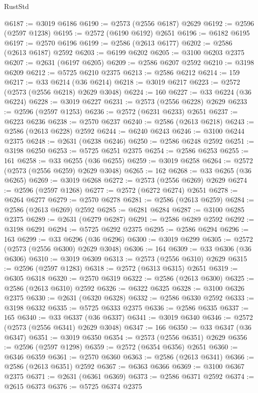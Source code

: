 \begin{lexlean}{RustStd}
\begin{coremodule}
@6187 := @3019 @6186
@6190 := @2573 (@2556 @6187) @2629
@6192 := @2596 (@2597 @1238)
@6195 := @2572 (@6190 @6192) @2651
@6196 := @6182 @6195
@6197 := @2570 @6196
@6199 := @2586 (@2613 @6177)
@6202 := @2586 (@2613 @6187) @2592
@6203 := @6199 @6202
@6205 := @3100 @6203 @2375
@6207 := @2631 (@6197 @6205)
@6209 := @2586 @6207 @2592
@6210 := @3198 @6209
@6212 := @5725 @6210 @2375
@6213 := @2586 @6212
@6214 := 159
@6217 := @33 @6214 (@36 @6214)
@6218 := @3019 @6217
@6223 := @2572 (@2573 (@2556 @6218) @2629 @3048)
@6224 := 160
@6227 := @33 @6224 (@36 @6224)
@6228 := @3019 @6227
@6231 := @2573 (@2556 @6228) @2629
@6233 := @2596 (@2597 @1253)
@6236 := @2572 (@6231 @6233) @2651
@6237 := @6223 @6236
@6238 := @2570 @6237
@6240 := @2586 (@2613 @6218)
@6243 := @2586 (@2613 @6228) @2592
@6244 := @6240 @6243
@6246 := @3100 @6244 @2375
@6248 := @2631 (@6238 @6246)
@6250 := @2586 @6248 @2592
@6251 := @3198 @6250
@6253 := @5725 @6251 @2375
@6254 := @2586 @6253
@6255 := 161
@6258 := @33 @6255 (@36 @6255)
@6259 := @3019 @6258
@6264 := @2572 (@2573 (@2556 @6259) @2629 @3048)
@6265 := 162
@6268 := @33 @6265 (@36 @6265)
@6269 := @3019 @6268
@6272 := @2573 (@2556 @6269) @2629
@6274 := @2596 (@2597 @1268)
@6277 := @2572 (@6272 @6274) @2651
@6278 := @6264 @6277
@6279 := @2570 @6278
@6281 := @2586 (@2613 @6259)
@6284 := @2586 (@2613 @6269) @2592
@6285 := @6281 @6284
@6287 := @3100 @6285 @2375
@6289 := @2631 (@6279 @6287)
@6291 := @2586 @6289 @2592
@6292 := @3198 @6291
@6294 := @5725 @6292 @2375
@6295 := @2586 @6294
@6296 := 163
@6299 := @33 @6296 (@36 @6296)
@6300 := @3019 @6299
@6305 := @2572 (@2573 (@2556 @6300) @2629 @3048)
@6306 := 164
@6309 := @33 @6306 (@36 @6306)
@6310 := @3019 @6309
@6313 := @2573 (@2556 @6310) @2629
@6315 := @2596 (@2597 @1283)
@6318 := @2572 (@6313 @6315) @2651
@6319 := @6305 @6318
@6320 := @2570 @6319
@6322 := @2586 (@2613 @6300)
@6325 := @2586 (@2613 @6310) @2592
@6326 := @6322 @6325
@6328 := @3100 @6326 @2375
@6330 := @2631 (@6320 @6328)
@6332 := @2586 @6330 @2592
@6333 := @3198 @6332
@6335 := @5725 @6333 @2375
@6336 := @2586 @6335
@6337 := 165
@6340 := @33 @6337 (@36 @6337)
@6341 := @3019 @6340
@6346 := @2572 (@2573 (@2556 @6341) @2629 @3048)
@6347 := 166
@6350 := @33 @6347 (@36 @6347)
@6351 := @3019 @6350
@6354 := @2573 (@2556 @6351) @2629
@6356 := @2596 (@2597 @1298)
@6359 := @2572 (@6354 @6356) @2651
@6360 := @6346 @6359
@6361 := @2570 @6360
@6363 := @2586 (@2613 @6341)
@6366 := @2586 (@2613 @6351) @2592
@6367 := @6363 @6366
@6369 := @3100 @6367 @2375
@6371 := @2631 (@6361 @6369)
@6373 := @2586 @6371 @2592
@6374 := @2615 @6373
@6376 := @5725 @6374 @2375

\end{coremodule}
\end{lexlean}
